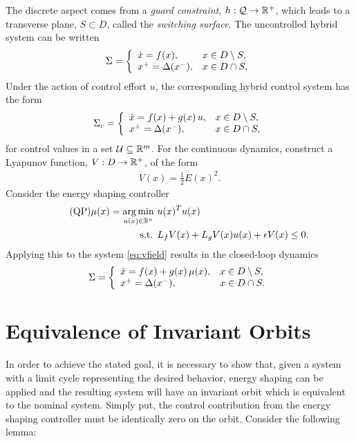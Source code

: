 \documentclass[twocolumn]{article}
\begin{document}
The discrete aspect comes from a {\em guard constraint}, $h : \mathcal{Q} \to \mathbb{R}^{+}$, which leads to a transverse plane, $S \subset D$, called the {\em switching surface}.
%
The uncontrolled hybrid system can be written
\begin{align}
  \Sigma = \left\{
  \begin{array}{l l}
    {\dot x} = f(x), & x \in D \setminus S,\\
    x^{+} = \Delta(x^{-}), &x \in D \cap S,
  \end{array}\right.
  \label{eq:vfield}
\end{align}
Under the action of control effort $u$, the corresponding hybrid control system has the form
\begin{align}
  \Sigma_{c} = \left\{
  \begin{array}{l l}
    {\dot x} = f(x) + g(x) \, u, & x \in D \setminus S,\\
    x^{+} = \Delta(x^{-}), &x \in D \cap S,
  \end{array}\right.
  \label{eq:csys}
\end{align}
for control values in a set $\mathcal{U} \subseteq \mathbb{R}^{m}$.
%
For the continuous dynamics, construct a Lyapunov function, $V : D \to \mathbb{R}^{+}$, of the form
\begin{align}
  \label{eq:lyap}
  V(x) = \frac{1}{2} E(x)^2.
\end{align}
Consider the energy shaping controller
\begin{align}
  \label{eq:es-qp} \tag {QP}
  \mu(x) = \operatorname*{arg\,min}_{u(x) \in \mathbb{R}^{n}} \ & u(x)^T u(x)\\
  \nonumber
  \mbox{s.t. } & L_{f} V(x) + L_{g} V(x) u(x) + \epsilon V(x) \leq 0.
\end{align}
Applying this to the system \eqref{eq:vfield} results in the closed-loop dynamics
\begin{align}
  \label{eq:vfield-cl}
  \Sigma = \left\{
  \begin{array}{l l}
    {\dot x} = f(x) + g(x) \, \mu(x), & x \in D \setminus S,\\
    x^{+} = \Delta(x^{-}), &x \in D \cap S.
  \end{array}\right.
\end{align}

\section{Equivalence of Invariant Orbits}
In order to achieve the stated goal, it is necessary to show that, given a system with a limit cycle representing the desired behavior, energy shaping can be applied and the resulting system will have an invariant orbit which is equivalent to the nominal system. Simply put, the control contribution from the energy shaping controller must be identically zero on the orbit. Consider the following lemma:
\end{document}
